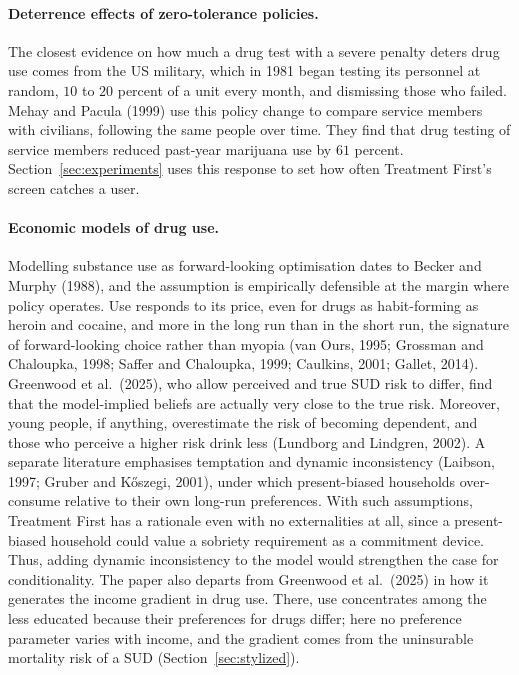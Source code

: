 \documentclass[10pt]{article}
\begin{document}
\paragraph{Deterrence effects of zero-tolerance policies.} The closest evidence on how much a drug test with a severe penalty deters drug use comes from the US military, which in 1981 began testing its personnel at random, $10$ to $20$ percent of a unit every month, and dismissing those who failed. Mehay and Pacula (1999) use this policy change to compare service members with civilians, following the same people over time.    They find that drug testing of service members reduced past-year marijuana use by $61$ percent.  Section~\ref{sec:experiments} uses this response to set how often Treatment First's screen catches a user.

\paragraph{Economic models of drug use.} Modelling substance use as forward-looking
optimisation dates to Becker and Murphy (1988), and the assumption is empirically
defensible at the margin where policy operates. Use responds to its price, even for drugs as habit-forming as heroin and cocaine, and more in the long run than in the short run, the signature of forward-looking choice rather than myopia (van Ours, 1995; Grossman and Chaloupka, 1998; Saffer and Chaloupka, 1999; Caulkins, 2001; Gallet, 2014). Greenwood et al.\ (2025), who allow perceived and true SUD risk to differ, find that the model-implied beliefs are actually very close to the true risk. Moreover, young people, if anything, overestimate the risk of becoming dependent, and those who perceive a higher risk drink less (Lundborg and Lindgren, 2002). A separate literature emphasises temptation and dynamic
inconsistency (Laibson, 1997; Gruber and K\H{o}szegi, 2001), under which
present-biased households over-consume relative to their own long-run preferences. With such assumptions, Treatment First has a rationale even with no externalities at all, since a present-biased household could value a sobriety requirement as a commitment device.   Thus, adding dynamic inconsistency to the model would strengthen the case for conditionality. The paper also departs from Greenwood et al.\ (2025) in how it generates the income gradient in drug use. There, use concentrates among the less educated because their preferences for drugs differ; here no preference parameter varies with income, and the gradient comes from the uninsurable mortality risk of a SUD (Section~\ref{sec:stylized}).
\end{document}
